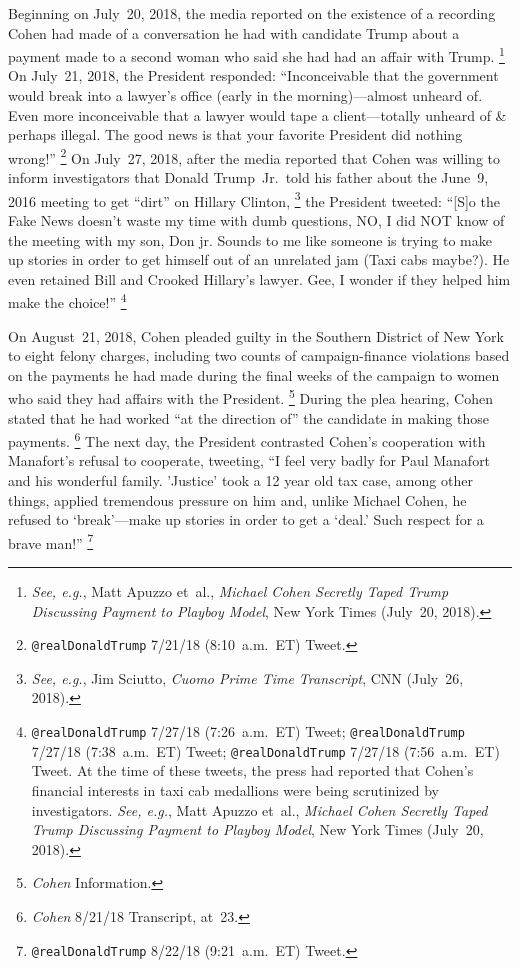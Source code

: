 Beginning on July~20, 2018, the media reported on the existence of a recording Cohen had made of a conversation he had with candidate Trump about a payment made to a second woman who said she had had an affair with Trump.%
\footnote{\textit{See, e.g.}, Matt Apuzzo et~al., \textit{Michael Cohen Secretly Taped Trump Discussing Payment to Playboy Model}, New York Times (July~20, 2018).}
On July~21, 2018, the President responded: ``Inconceivable that the government would break into a lawyer's office (early in the morning)---almost unheard of.
Even more inconceivable that a lawyer would tape a client---totally unheard of \& perhaps illegal.
The good news is that your favorite President did nothing wrong!''%
\footnote{\verb+@realDonaldTrump+ 7/21/18 (8:10~a.m.~ET) Tweet.}
On July~27, 2018, after the media reported that Cohen was willing to inform investigators that Donald Trump~Jr.\ told his father about the June~9, 2016 meeting to get ``dirt'' on Hillary Clinton,%
\footnote{\textit{See, e.g.}, Jim Sciutto, \textit{Cuomo Prime Time Transcript}, CNN (July~26, 2018).}
the President tweeted:
``[S]o the Fake News doesn't waste my time with dumb questions, NO, I did NOT know of the meeting with my son, Don jr.
Sounds to me like someone is trying to make up stories in order to get himself out of an unrelated jam (Taxi cabs maybe?).
He even retained Bill and Crooked Hillary's lawyer.
Gee, I wonder if they helped him make the choice!''%
\footnote{\verb+@realDonaldTrump+ 7/27/18 (7:26~a.m.~ET) Tweet;
\verb+@realDonaldTrump+ 7/27/18 (7:38~a.m.~ET) Tweet;
\verb+@realDonaldTrump+ 7/27/18 (7:56~a.m.~ET) Tweet.
At the time of these tweets, the press had reported that Cohen's financial interests in taxi cab medallions were being scrutinized by investigators.
\textit{See, e.g.}, Matt Apuzzo et~al., \textit{Michael Cohen Secretly Taped Trump Discussing Payment to Playboy Model}, New York Times (July~20, 2018).}

On August~21, 2018, Cohen pleaded guilty in the Southern District of New York to eight felony charges, including two counts of campaign-finance violations based on the payments he had made during the final weeks of the campaign to women who said they had affairs with the President.%
\footnote{\textit{Cohen} Information.}
During the plea hearing, Cohen stated that he had worked ``at the direction of\thinspace'' the candidate in making those payments.%
\footnote{\textit{Cohen} 8/21/18 Transcript, at~23.}
The next day, the President contrasted Cohen's cooperation with Manafort's refusal to cooperate, tweeting, ``I feel very badly for Paul Manafort and his wonderful family.
'Justice' took a 12 year old tax case, among other things, applied tremendous pressure on him and, unlike Michael Cohen, he refused to `break'---make up stories in order to get a `deal.'
Such respect for a brave man!''%
\footnote{\verb+@realDonaldTrump+ 8/22/18 (9:21~a.m.~ET) Tweet.}

